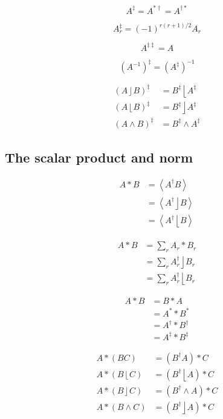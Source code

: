 \documentclass{utarticle}
\DeclareMathOperator{\lin}{\rfloor}
\DeclareMathOperator{\rin}{\lfloor}
\DeclareMathOperator{\out}{\wedge}
\newcommand{\grinv}[2][]{\ensuremath{#2^{*#1}}}
\newcommand{\rev}[1]{\ensuremath{#1^\dagger}}
\newcommand{\grinvrev}[1]{\ensuremath{#1^{*\dagger}}}
\newcommand{\revgrinv}[1]{\ensuremath{#1^{\dagger *}}}
\newcommand{\clifconj}[1]{\ensuremath{#1^\ddagger}}
\newcommand{\doubleclifconj}[1]{\ensuremath{#1^{\ddagger\ddagger}}}
\newcommand{\scprod}[2]{\ensuremath{#1 * #2}}
\newcommand{\grade}[2][]{\ensuremath{\left\langle #2 \right\rangle_{#1}}}
\begin{document}
\begin{equation} \clifconj{A} = \grinvrev{A} = \revgrinv{A} \end{equation}

\begin{equation} \clifconj{A_r} = (-1)^{r(r+1)/2} A_r \end{equation}

\begin{equation} \doubleclifconj{A} = A \end{equation}

\begin{equation} \clifconj{(A^{-1})} = (\clifconj{A})^{-1} \end{equation}

\begin{align}
\clifconj{(A \lin B)} & = \clifconj{B} \rin \clifconj{A} \\
\clifconj{(A \rin B)} & = \clifconj{B} \lin \clifconj{A} \\
\clifconj{(A \out B)} & = \clifconj{B} \out \clifconj{A}
\end{align}

\subsection{The scalar product and norm}
\label{app:scprod}

\begin{align} 
\scprod{A}{B} & = \grade{\rev{A} B} \\
 & = \grade{\rev{A} \lin B} \\
 & = \grade{\rev{A} \rin B}
\end{align}

\begin{align}
\scprod{A}{B} & = \sum_r \scprod{A_r}{B_r} \\
& = \sum_r \rev{A_r} \lin B_r \\
& = \sum_r \rev{A_r} \rin B_r
\end{align}  

\begin{align}
\scprod{A}{B} & = \scprod{B}{A} \\ 
 & = \scprod{\grinv{A}}{\grinv{B}} \\
 & = \scprod{\rev{A}}{\rev{B}} \\
 & = \scprod{\clifconj{A}}{\clifconj{B}}
\end{align}

\begin{align}
\scprod{A}{(BC)} & = \scprod{(\rev{B} A)}{C} \\
\scprod{A}{(B \rin C)} & = \scprod{(\rev{B} \rin A)}{C}  \\
\scprod{A}{(B \lin C)} & = \scprod{(\rev{B} \out A)}{C}  \\
\scprod{A}{(B \out C)} & = \scprod{(\rev{B} \lin A)}{C}
\end{align}
\end{document}
